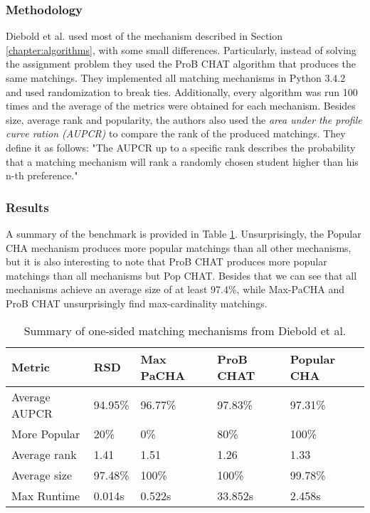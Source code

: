 \subsubsection{Methodology}
Diebold et al. used most of the mechanism described in Section \ref{chapter:algorithms}, with some small differences. Particularly, instead of solving the assignment problem they used the ProB CHAT algorithm that produces the same matchings. They implemented all matching mechanisms in Python 3.4.2 and used randomization to break ties. Additionally, every algorithm was run 100 times and the average of the metrics were obtained for each mechanism. 
Besides size, average rank and popularity, the authors also used the \emph{area under the profile curve ration (AUPCR)} to compare the rank of the produced matchings. They define it as follows: "The AUPCR up to a specific rank describes the probability that a matching mechanism will rank a randomly chosen student higher than his n-th preference."\cite{DieboldBenchmark}

\subsubsection{Results}
A summary of the benchmark is provided in Table \ref{tab:diebold-benchmark}. Unsurprisingly, the Popular CHA mechanism produces more popular matchings than all other mechanisms, but it is also interesting to note that ProB CHAT produces more popular matchings than all mechanisms but Pop CHAT. Besides that we can see that all mechanisms achieve an average size of at least 97.4\%, while Max-PaCHA and ProB CHAT unsurprisingly find max-cardinality matchings.

\begin{table}[h!]
    \centering 
    \begin{tabular}{|l|l|l|l|l|}
        \hline
        Metric & RSD & Max PaCHA & ProB CHAT & Popular CHA \\ \hline
        Average AUPCR & 94.95\% & 96.77\% & \cellcolor[HTML]{9AFF99}97.83\% & 97.31\% \\ \hline
        More Popular & 20\% & 0\% & 80\% & \cellcolor[HTML]{9AFF99}100\% \\ \hline
        Average rank & 1.41 & 1.51 & \cellcolor[HTML]{9AFF99}1.26 & 1.33 \\ \hline
        Average size & 97.48\% & \cellcolor[HTML]{9AFF99}100\% & \cellcolor[HTML]{9AFF99}100\% & 99.78\% \\ \hline
        Max Runtime & \cellcolor[HTML]{9AFF99}0.014s & 0.522s & \cellcolor[HTML]{FFCCC9}33.852s & 2.458s \\ \hline
        \end{tabular}
    \caption{Summary of one-sided matching mechanisms from Diebold et al. \cite{DieboldBenchmark}}
    \label{tab:diebold-benchmark}
\end{table}

